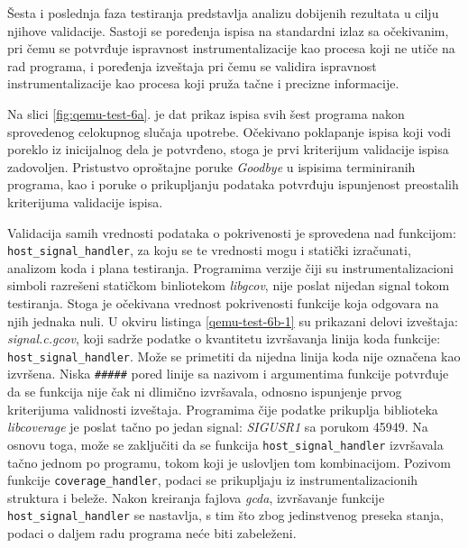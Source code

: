 \documentclass[12pt,oneside]{memoir}
\newcommand{\kod}[1]{\texttt{#1}}
\newcommand{\strano}[1]{\textit{#1}}
\begin{document}
Šesta i poslednja faza testiranja predstavlja analizu dobijenih rezultata u cilju njihove validacije. Sastoji se poređenja ispisa na standardni izlaz sa očekivanim, pri čemu se potvrđuje ispravnost instrumentalizacije kao procesa koji ne utiče na rad programa, i  poređenja izveštaja pri čemu se validira ispravnost instrumentalizacije kao procesa koji pruža tačne i precizne informacije. 

Na slici \ref{fig:qemu-test-6a}. je dat prikaz ispisa svih šest programa nakon sprovedenog celokupnog slučaja upotrebe. Očekivano poklapanje ispisa koji vodi poreklo iz inicijalnog dela je potvrđeno, stoga je prvi kriterijum validacije ispisa zadovoljen. Pristustvo oproštajne poruke \strano{Goodbye} u ispisima terminiranih programa, kao i poruke o prikupljanju podataka
potvrđuju ispunjenost preostalih kriterijuma validacije ispisa.

Validacija samih vrednosti podataka o pokrivenosti je sprovedena nad funkcijom: \kod{host\_signal\_handler}, za koju se te vrednosti mogu i statički izračunati, analizom koda i plana testiranja. Programima verzije čiji su instrumentalizacioni simboli razrešeni statičkom binliotekom \strano{libgcov}, nije poslat nijedan signal tokom testiranja. Stoga je očekivana vrednost pokrivenosti funkcije koja odgovara na njih jednaka nuli. U okviru listinga \ref{qemu-test-6b-1} su prikazani delovi izveštaja: \strano{signal.c.gcov}, koji sadrže podatke o kvantitetu izvršavanja linija koda funkcije: \kod{host\_signal\_handler}. Može se primetiti da nijedna linija koda nije označena kao izvršena. Niska \kod{\#\#\#\#\#} pored linije sa nazivom i argumentima funkcije potvrđuje da se funkcija nije čak ni dlimično izvršavala, odnosno ispunjenje prvog kriterijuma validnosti izveštaja. Programima čije podatke prikuplja biblioteka \strano{libcoverage} je poslat tačno po jedan signal: \strano{SIGUSR1} sa porukom 45949. Na osnovu toga, može se zaključiti da se funkcija \kod{host\_signal\_handler} izvršavala tačno jednom po programu, tokom koji je uslovljen tom kombinacijom. Pozivom funkcije \kod{coverage\_handler}, podaci se prikupljaju iz instrumentalizacionih struktura i beleže. Nakon kreiranja fajlova \strano{gcda}, izvršavanje funkcije \kod{host\_signal\_handler} se nastavlja, s tim što zbog jedinstvenog preseka stanja, podaci o daljem radu programa neće biti zabeleženi. 
\end{document}
